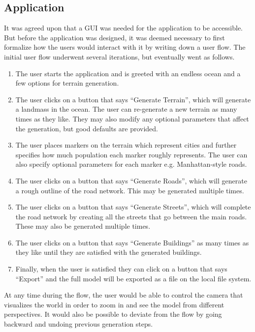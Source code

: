 \subsection{Application}

It was agreed upon that a GUI was needed for the application to be accessible.
But before the application was designed, it was deemed necessary to first formalize how the users would interact with it by writing down a user flow.
The initial user flow underwent several iterations, but eventually went as follows.

\begin{enumerate}
\item The user starts the application and is greeted with an endless ocean and a few options for terrain generation.
\item The user clicks on a button that says “Generate Terrain”, which will generate a landmass in the ocean. The user can re-generate a new terrain as many times as they like. They may also modify any optional parameters that affect the generation, but good defaults are provided.
\item The user places markers on the terrain which represent cities and further specifies how much population each marker roughly represents. The user can also specify optional parameters for each marker e.g. Manhattan-style roads.
\item The user clicks on a button that says “Generate Roads”, which will generate a rough outline of the road network. This may be generated multiple times.
\item The user clicks on a button that says “Generate Streets”, which will complete the road network by creating all the streets that go between the main roads. These may also be generated multiple times.
\item The user clicks on a button that says “Generate Buildings” as many times as they like until they are satisfied with the generated buildings.
\item Finally, when the user is satisfied they can click on a button that says “Export” and the full model will be exported as a file on the local file system.
\end{enumerate}

At any time during the flow, the user would be able to control the camera that visualizes the world in order to zoom in and see the model from different perspectives.
It would also be possible to deviate from the flow by going backward and undoing previous generation steps.

